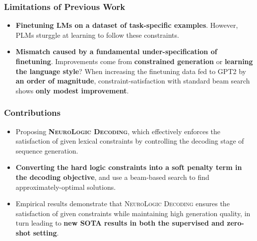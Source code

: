 \documentclass[10pt,aspectratio=43]{beamer}
\newcommand{\method}{\frenchspacing\textsc{NeuroLogic Decoding}\xspace}
\begin{document}
    \begin{frame}
        \frametitle{\textbf{Limitations of Previous Work}}
        \begin{itemize}
            \item \textbf{Finetuning LMs on a dataset of task-specific examples}. However, PLMs sturggle at learning to follow these constraints.
            \item \textbf{Mismatch caused by a fundamental under-specification of finetuning}. Improvements come from \textbf{constrained generation} or \textbf{learning the language style}? When increasing the finetuning data fed to GPT2 by \textbf{an order of magnitude}, constraint-satisfaction with standard beam search shows \textbf{only modest improvement}.
        \end{itemize}
    \end{frame}
    
    \begin{frame}
        \frametitle{\textbf{Contributions}}
        \begin{itemize}
            \item Proposing \textbf{\method{}}, which effectively enforces the satisfaction of given lexical constraints by controlling the decoding stage of sequence generation.
            \item  \textbf{Converting the hard logic constraints into a soft penalty term in the decoding objective}, and use a beam-based search to find approximately-optimal solutions.
            \item Empirical results demonstrate that \method{} ensures the satisfaction of given constraints while maintaining high generation quality, in turn leading to \textbf{new SOTA results in both the supervised and zero-shot setting}.
        \end{itemize}
    \end{frame}
    
\end{document}
